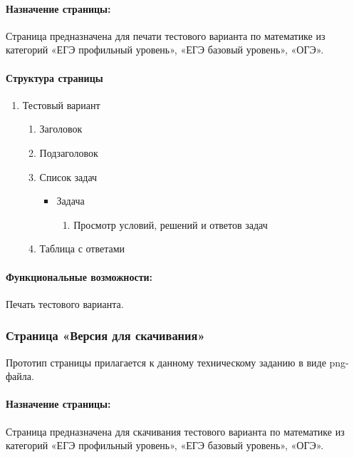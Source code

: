 \paragraph{Назначение страницы:} Страница предназначена для печати тестового варианта по математике из категорий «ЕГЭ профильный уровень», «ЕГЭ базовый уровень», «ОГЭ».

\paragraph{Структура страницы}
\begin{enumerate}
	\item Тестовый вариант
	\begin{enumerate}
		\item Заголовок
		\item Подзаголовок
		\item Список задач
		\begin{itemize}
			\item Задача
			\begin{enumerate}
				\item Просмотр условий, решений и ответов задач
			\end{enumerate}
		\end{itemize}
		\item Таблица с ответами
	\end{enumerate}
\end{enumerate}

\paragraph{Функциональные возможности:} Печать тестового варианта.


\subsubsection{Страница «Версия для скачивания»}

Прототип страницы прилагается к данному техническому заданию в виде png-файла.

\paragraph{Назначение страницы:} Страница предназначена для скачивания тестового варианта по математике из категорий «ЕГЭ профильный уровень», «ЕГЭ базовый уровень», «ОГЭ».

